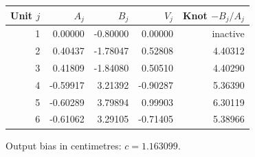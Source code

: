 \begin{center}\begin{tabular}{rrrrr}
\toprule
Unit $j$ & $A_j$ & $B_j$ & $V_j$ & Knot $-B_j/A_j$\\
\midrule
1 & 0.00000 & -0.80000 & 0.00000 & inactive\\
2 & 0.40437 & -1.78047 & 0.52808 & 4.40312\\
3 & 0.41809 & -1.84080 & 0.50510 & 4.40290\\
4 & -0.59917 & 3.21392 & -0.90287 & 5.36390\\
5 & -0.60289 & 3.79894 & 0.99903 & 6.30119\\
6 & -0.61062 & 3.29105 & -0.71405 & 5.38966\\
\bottomrule
\end{tabular}\end{center}
Output bias in centimetres: $c=1.163099$.
